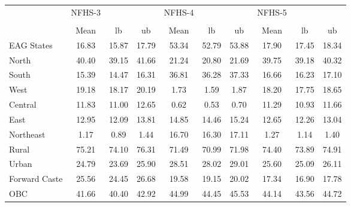 {
\def\sym#1{\ifmmode^{#1}\else\(^{#1}\)\fi}
\begin{tabular}{l*{3}{ccc}}
\hline\hline
                    &      NFHS-3&            &            &      NFHS-4&            &            &      NFHS-5&            &            \\
                    &\multicolumn{3}{c}{}                  &\multicolumn{3}{c}{}                  &\multicolumn{3}{c}{}                  \\
                    &        Mean&          lb&          ub&        Mean&          lb&          ub&        Mean&          lb&          ub\\
\hline
EAG States          &       16.83&       15.87&       17.79&       53.34&       52.79&       53.88&       17.90&       17.45&       18.34\\
North               &       40.40&       39.15&       41.66&       21.24&       20.80&       21.69&       39.75&       39.18&       40.32\\
South               &       15.39&       14.47&       16.31&       36.81&       36.28&       37.33&       16.66&       16.23&       17.10\\
West                &       19.18&       18.17&       20.19&        1.73&        1.59&        1.87&       18.20&       17.75&       18.65\\
Central             &       11.83&       11.00&       12.65&        0.62&        0.53&        0.70&       11.29&       10.93&       11.66\\
East                &       12.95&       12.09&       13.81&       14.85&       14.46&       15.24&       12.65&       12.26&       13.04\\
Northeast           &        1.17&        0.89&        1.44&       16.70&       16.30&       17.11&        1.27&        1.14&        1.40\\
Rural               &       75.21&       74.10&       76.31&       71.49&       70.99&       71.98&       74.40&       73.89&       74.91\\
Urban               &       24.79&       23.69&       25.90&       28.51&       28.02&       29.01&       25.60&       25.09&       26.11\\
Forward Caste       &       25.56&       24.45&       26.68&       19.58&       19.15&       20.02&       17.34&       16.90&       17.78\\
OBC                 &       41.66&       40.40&       42.92&       44.99&       44.45&       45.53&       44.14&       43.56&       44.72\\

\end{tabular}}
